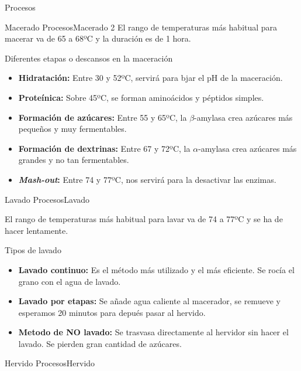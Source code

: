 \begin{frame}[fragile]{Procesos}
\begin{block}{Macerado}
\protect\hypertarget{macerado-1}{}
ProcesosMacerado 2 El rango de temperaturas más habitual para macerar va
de 65 a 68ºC y la duración es de 1 hora.

Diferentes etapas o descansos en la maceración

\begin{itemize}
\item
  \textbf{Hidratación:} Entre 30 y 52ºC, servirá para bjar el pH de la
  maceración.
\item
  \textbf{Proteínica:} Sobre 45ºC, se forman aminoácidos y péptidos
  simples.
\item
  \textbf{Formación de azúcares:} Entre 55 y 65ºC, la \(\beta\)-amylasa
  crea azúcares más pequeños y muy fermentables.
\item
  \textbf{Formación de dextrinas:} Entre 67 y 72ºC, la
  \(\alpha\)-amylasa crea azúcares más grandes y no tan fermentables.
\item
  \textbf{\emph{Mash-out}:} Entre 74 y 77ºC, nos servirá para la
  desactivar las enzimas.
\end{itemize}
\end{block}

\begin{block}{Lavado}
\protect\hypertarget{lavado}{}
ProcesosLavado

El rango de temperaturas más habitual para lavar va de 74 a 77ºC y se ha
de hacer lentamente.

Tipos de lavado

\begin{itemize}
\item
  \textbf{Lavado continuo:} Es el método más utilizado y el más
  eficiente. Se rocía el grano con el agua de lavado.
\item
  \textbf{Lavado por etapas:} Se añade agua caliente al macerador, se
  remueve y esperamos 20 minutos para depués pasar al hervido.
\item
  \textbf{Metodo de NO lavado:} Se trasvasa directamente al hervidor sin
  hacer el lavado. Se pierden gran cantidad de azúcares.
\end{itemize}
\end{block}

\begin{block}{Hervido}
\protect\hypertarget{hervido}{}
ProcesosHervido


\end{block}
\end{frame}
